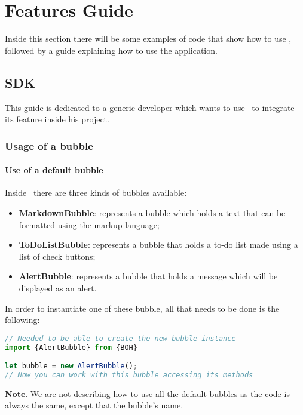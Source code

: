 \section{Features Guide}
Inside this section there will be some examples of code that show how to use \progettoShort, followed by a guide explaining how to use the \app application.

\subsection{SDK}
This guide is dedicated to a generic developer which wants to use \progettoShort\ to integrate its feature inside his  project. 

\subsubsection{Usage of a bubble}
\paragraph{Use of a default bubble}
Inside \progettoShort\ there are three kinds of bubbles available:
\begin{itemize}
	\item \textbf{MarkdownBubble}: represents a bubble which holds a text that can be formatted using the  markup language;
	\item \textbf{ToDoListBubble}: represents a bubble that holds a to-do list made using a list of check buttons;
	\item \textbf{AlertBubble}: represents a bubble that holds a message which will be displayed as an alert.
\end{itemize}


In order to instantiate one of these bubble, all that needs to be done is the following:
\begin{lstlisting}[language=JavaScript, frame=single]
// Needed to be able to create the new bubble instance
import {AlertBubble} from {BOH}

let bubble = new AlertBubble();
// Now you can work with this bubble accessing its methods
\end{lstlisting}

\textbf{Note}. We are not describing how to use all the default bubbles as the code is always the same, except that the bubble's name.

